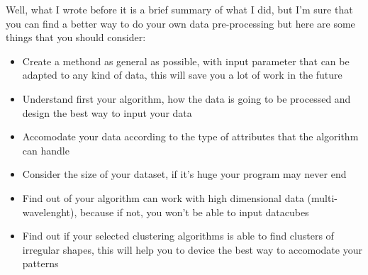 \documentclass[11pt,fleqn]{book} %
\begin{document}
																																																																																																																																																																																																			    Well, what I wrote before it is a brief summary of what I did, but I'm sure that you can find a better way to do your own data pre-processing but here are some things that you should consider:
																																																																																																																																																																																																			    	\begin{itemize}
																																																																																																																																																																																																				    	\item Create a methond as general as possible, with input parameter that can be adapted to any kind of data, this will save you a lot of work in the future
																																																																																																																																																																																																					        \item Understand first your algorithm, how the data is going to be processed and design the best way to input your data
																																																																																																																																																																																																						        \item Accomodate your data according to the type of attributes that the algorithm can handle
																																																																																																																																																																																																							        \item Consider the size of your dataset, if it's huge your program may never end
																																																																																																																																																																																																								        \item Find out of your algorithm can work with high dimensional data (multi-wavelenght), because if not, you won't be able to input datacubes
																																																																																																																																																																																																									        \item Find out if your selected clustering algorithms is able to find clusters of irregular shapes, this will help you to device the best way to accomodate your patterns

\end{itemize}
\end{document}
